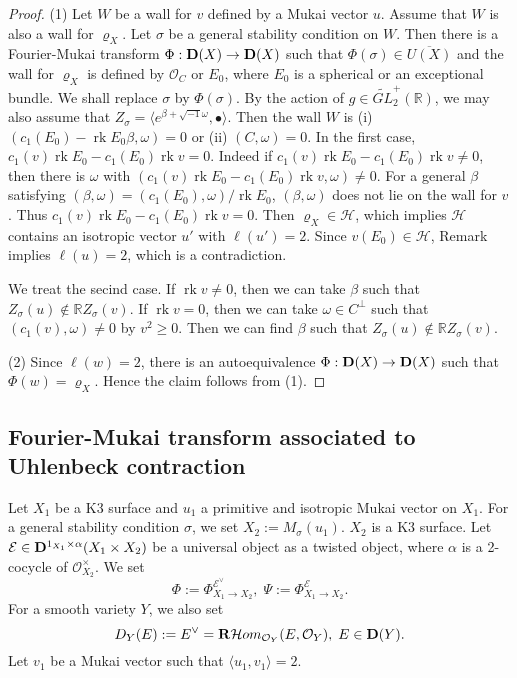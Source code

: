 \documentclass[leqno,11pt]{amsart}
\def\R{\ensuremath{\mathbb{R}}}
\def\rk{\mathop{\mathrm{rk}}}
\theoremstyle{definition}
\def\R{\ensuremath{\mathbb{R}}}
\def\EE{\ensuremath{\mathcal E}}
\def\HH{\ensuremath{\mathcal H}}
\def\OO{\ensuremath{\mathcal O}}
\begin{document}
\begin{proof}
(1) Let $W$ be a wall for $v$ defined by a Mukai vector $u$. 
Assume that $W$ is also a wall for $\varrho_X$.
Let $\sigma$ be a general stability condition on $W$.
Then there is a Fourier-Mukai transform $\Phi:{\bf D}(X) \to {\bf D}(X)$
such that $\Phi(\sigma) \in \overline{U(X)}$
and the wall for $\varrho_X$ is defined by $\OO_C$ or 
$E_0$, where $E_0$ is a spherical or an exceptional bundle.
We shall replace $\sigma$ by $\Phi(\sigma)$.
By the action of $g \in \widetilde{GL}_2^+(\R)$,
we may also assume that 
$Z_{\sigma}=\langle e^{\beta+\sqrt{-1}\omega},\bullet \rangle$.
Then  the wall $W$ is (i) $(c_1(E_0)-\rk E_0 \beta, \omega)=0$ or
(ii) $(C,\omega)=0$.
In the first case, 
$c_1(v) \rk E_0-c_1(E_0)\rk v=0$.
Indeed if $c_1(v) \rk E_0-c_1(E_0)\rk v \ne 0$, then
there is $\omega$ with $(c_1(v) \rk E_0-c_1(E_0)\rk v,\omega) \ne 0$.
For a general $\beta$ satisfying
$(\beta,\omega)=(c_1(E_0),\omega)/\rk E_0$,
$(\beta,\omega)$ does not lie on the wall for $v$.
Thus $c_1(v) \rk E_0-c_1(E_0)\rk v=0$.
Then $\varrho_X \in \HH$, which implies $\HH$ contains
an isotropic vector $u'$ with $\ell(u')=2$.
Since $v(E_0) \in \HH$, Remark \label{Rem:negative stable classes} implies
$\ell(u)=2$, which is a contradiction.

We treat the secind case.
If $\rk v \ne 0$, then
we can take $\beta$ such that $Z_\sigma(u) \not \in \R Z_\sigma(v)$.
If $\rk v=0$, then we can take $\omega \in C^\perp$
such that $(c_1(v),\omega) \ne 0$ by $v^2 \geq 0$.
Then we can find $\beta$ such that
$Z_\sigma(u) \not \in \R Z_\sigma(v)$.

(2) Since $\ell(w)=2$, there is an autoequivalence
$\Phi:{\bf D}(X) \to {\bf D}(X)$
such that $\Phi(w)=\varrho_X$.
Hence the claim follows from (1). 
\end{proof}  
 


\subsection{Fourier-Mukai transform associated to
Uhlenbeck contraction}

Let $X_1$ be a K3 surface and $u_1$ 
a primitive and isotropic Mukai vector on $X_1$.
For a general stability condition
$\sigma$, we set $X_2:=M_\sigma(u_1)$.
$X_2$ is a K3 surface.
Let $\EE \in {\bf D}^{1_{X_1} \times \alpha}(X_1 \times X_2)$ be a
universal object as a twisted object, where
$\alpha$ is a 2-cocycle of $\OO_{X_2}^{\times}$. 
We set
\begin{equation}
\Phi:=\Phi_{X_1 \to X_2}^{\EE^{\vee}},\;
\Psi:=\Phi_{X_1 \to X_2}^{\EE}.
\end{equation}
For a smooth variety $Y$,
we also set
\begin{equation}
D_Y(E):=E^{\vee}={\bf R}\HH om_{\OO_Y}(E,\OO_Y),\; E \in {\bf D}(Y).
\end{equation}
Let $v_1$ be a Mukai vector such that $\langle u_1,v_1 \rangle=2$.
\end{document}
